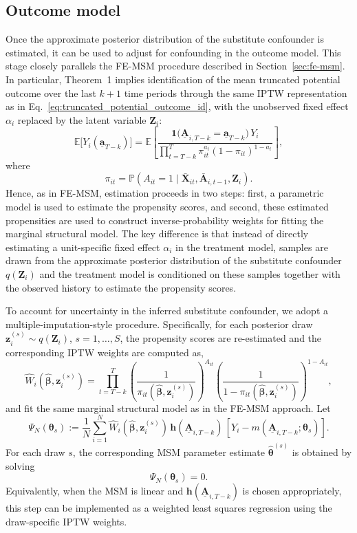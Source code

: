 \subsection{Outcome model}
\label{sec:seqgplvm-outcome}
Once the approximate posterior distribution of the substitute confounder is estimated, 
it can be used to adjust for confounding in the outcome model. This stage 
closely parallels the FE-MSM procedure described in Section~\ref{sec:fe-msm}. In
particular, Theorem~1 implies identification of the mean truncated potential outcome
over the last $k+1$ time periods through the same IPTW representation as in
Eq.~\eqref{eq:truncated_potential_outcome_id}, with the unobserved fixed effect
$\alpha_i$ replaced by the latent variable $\mathbf{Z}_i$:
\begin{equation}
    \label{eq:truncated_potential_outcome_id_seqgplvm}
    \mathbb{E}\bigl[Y_i(\underline{\mathbf{a}}_{T-k})\bigr]
    =
    \mathbb{E}\left[
    \frac{\mathbf{1}\bigl(\underline{\mathbf{A}}_{i,T-k} = \underline{\mathbf{a}}_{T-k}\bigr)\, Y_i}
    {\prod_{t=T-k}^{T} \pi_{it}^{a_t} (1 - \pi_{it})^{1-a_t}}
    \right],
\end{equation}
where
\[
\pi_{it}
=
\mathbb{P}(A_{it}=1 \mid \bar{\mathbf{X}}_{it}, \bar{\mathbf{A}}_{i,t-1}, \mathbf{Z}_i).
\]
Hence, as in FE-MSM, estimation proceeds in two steps: first, a parametric model is used
to estimate the propensity scores, and second, these estimated propensities are used to
construct inverse-probability weights for fitting the marginal structural model. The key
difference is that instead of directly estimating a unit-specific fixed effect $\alpha_i$ 
in the treatment model, samples are drawn from the approximate posterior distribution 
of the substitute confounder $q(\mathbf{Z}_i)$ and the treatment model is conditioned
on these samples together with the observed history 
to estimate the propensity scores.

To account for uncertainty in the inferred substitute confounder, we adopt a
multiple-imputation-style procedure. Specifically, for each posterior draw 
$\mathbf{z}_i^{(s)} \sim q(\mathbf{Z}_i)$, $s=1,\dots,S$, the propensity scores are 
re-estimated and the corresponding IPTW weights are computed as,
\[
\widehat{W}_i(\hat{\boldsymbol{\beta}}, \mathbf{z}_i^{(s)})
=
\prod_{t=T-k}^{T}
\left(\frac{1}{\pi_{it}(\hat{\boldsymbol{\beta}},\mathbf{z}_i^{(s)})}\right)^{A_{it}}
\left(\frac{1}{1-\pi_{it}(\hat{\boldsymbol{\beta}},\mathbf{z}_i^{(s)})}\right)^{1-A_{it}},
\]
and fit the same marginal structural model as in the FE-MSM approach. Let
\[
\Psi_N(\boldsymbol{\theta}_s)
:=
\frac{1}{N} \sum_{i=1}^{N}
\widehat{W}_i(\hat{\boldsymbol{\beta}}, \mathbf{z}_i^{(s)})\,
\mathbf{h}\!\left(\underline{\mathbf{A}}_{i,T-k}\right)\,
\left[
Y_i - m\!\left(\underline{\mathbf{A}}_{i,T-k}; \boldsymbol{\theta}_s \right)
\right].
\]
For each draw $s$, the corresponding MSM parameter estimate $\hat{\boldsymbol{\theta}}^{(s)}$ is
obtained by solving
\[
\Psi_N(\boldsymbol{\theta}_s)=0.
\]
Equivalently, when the MSM is linear and $\mathbf{h}(\underline{\mathbf{A}}_{i,T-k})$ is chosen
appropriately, this step can be implemented as a weighted least squares regression using
the draw-specific IPTW weights.

